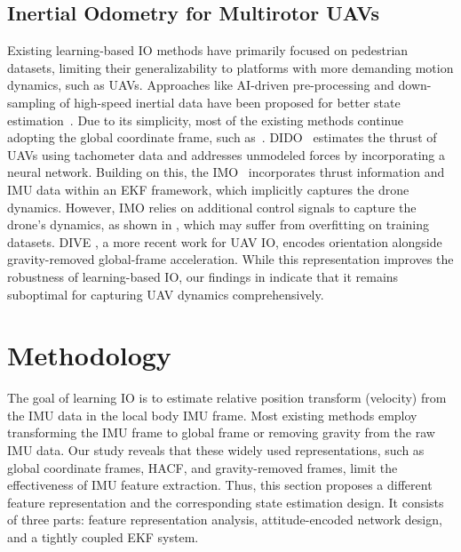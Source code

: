 \subsection{Inertial Odometry for Multirotor UAVs}

Existing learning-based IO methods have primarily focused on pedestrian datasets, limiting their generalizability to platforms with more demanding motion dynamics, such as UAVs.
Approaches like AI-driven pre-processing and down-sampling of high-speed inertial data have been proposed for better state estimation~\cite{steinbrener2022improved}.
Due to its simplicity, most of the existing methods continue adopting the global coordinate frame, such as~\cite{zhang2022dido, CioffiRal2023, bajwa2024dive}.
DIDO~\cite{zhang2022dido} estimates the thrust of UAVs using tachometer data and addresses unmodeled forces by incorporating a neural network.
Building on this, the IMO~\cite{CioffiRal2023} incorporates thrust information and IMU data within an EKF framework, which implicitly captures the drone dynamics.
However, IMO relies on additional control signals to capture the drone's dynamics, as shown in , which may suffer from overfitting on training datasets.
DIVE \cite{bajwa2024dive}, a more recent work for UAV IO, encodes orientation alongside gravity-removed global-frame acceleration.
While this representation improves the robustness of learning-based IO, our findings in  indicate that it remains suboptimal for capturing UAV dynamics comprehensively.


\section{Methodology}
\label{sec:airio:method}

The goal of learning IO is to estimate relative position transform (velocity) from the IMU data in the local body IMU frame.
Most existing methods employ transforming the IMU frame to global frame or removing gravity from the raw IMU data\cite{herath2020ronin, cao2022rio,bajwa2024dive}.
Our study reveals that these widely used representations, such as global coordinate frames, HACF, and gravity-removed frames, limit the effectiveness of IMU feature extraction. Thus, this section proposes a different feature representation and the corresponding state estimation design. It consists of three parts: feature representation analysis, attitude-encoded network design, and a tightly coupled EKF system.

